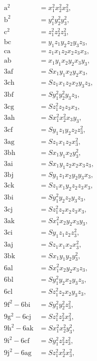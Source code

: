 \documentclass[11pt]{article}
\begin{document}
\[
\begin{aligned}
\mathrm{a}^2 &= x_1^2 x_2^2 x_3^2,\\
\mathrm{b}^2 &= y_1^2 y_2^2 y_3^2,\\
\mathrm{c}^2 &= z_1^2 z_2^2 z_3^2,\\
\mathrm{bc} &= y_1 z_1 y_2 z_2 y_3 z_3,\\
\mathrm{ca} &= z_1 x_1 z_2 x_2 z_3 x_3,\\
\mathrm{ab} &= x_1 y_1 x_2 y_2 x_3 y_3,\\
3\mathrm{af} &= S x_1 y_1 x_2 y_2 x_3,\\
3\mathrm{ch} &= S z_1 x_1 z_2 x_2 y_3 z_3,\\
3\mathrm{bf} &= S y_1^2 y_2^2 y_3 z_3,\\
3\mathrm{cg} &= S z_1^2 z_2 z_3 x_3,\\
3\mathrm{ah} &= S x_1^2 x_2^2 x_3 y_3,\\
3\mathrm{cf} &= S y_1 z_1 y_2 z_2 z_3^2,\\
3\mathrm{ag} &= S z_1 x_1 z_2 x_3^2,\\
3\mathrm{bh} &= S x_1 y_1 x_2 y_3^2,\\
3\mathrm{ai} &= S x_1 y_1 z_2 x_2 x_3 z_3,\\
3\mathrm{bj} &= S y_1 z_1 x_2 y_2 y_3 x_3,\\
3\mathrm{ck} &= S z_1 x_1 y_2 z_2 z_3 x_3,\\
3\mathrm{bi} &= S y_1^2 y_2 z_2 y_3 z_3,\\
3\mathrm{cj} &= S z_1^2 z_2 x_2 z_3 x_3,\\
3\mathrm{ak} &= S x_1^2 x_2 y_2 x_3 y_3,\\
3\mathrm{ci} &= S y_1 z_1 z_2 z_3^2,\\
3\mathrm{aj} &= S z_1 x_1 x_2 x_3^2,\\
3\mathrm{bk} &= S x_1 y_1 y_2 y_3^2,\\
6\mathrm{al} &= S x_1^2 x_2 y_2 x_3 z_3,\\
6\mathrm{bl} &= S y_1^2 y_2 x_2 y_3 z_3,\\
6\mathrm{cl} &= S z_1^2 z_2 x_2 y_3 z_3,\\
9\mathrm{f}^2 - 6\mathrm{bi} &= S y_1^2 y_2^2 z_3^2,\\
9\mathrm{g}^2 - 6\mathrm{cj} &= S z_1^2 z_2^2 x_3^2,\\
9\mathrm{h}^2 - 6\mathrm{ak} &= S x_1^2 x_2^2 y_3^2,\\
9\mathrm{i}^2 - 6\mathrm{cf} &= S y_1^2 z_2^2 z_3^2,\\
9\mathrm{j}^2 - 6\mathrm{ag} &= S z_1^2 x_2^2 x_3^2,\\

\end{aligned}\]
\end{document}
